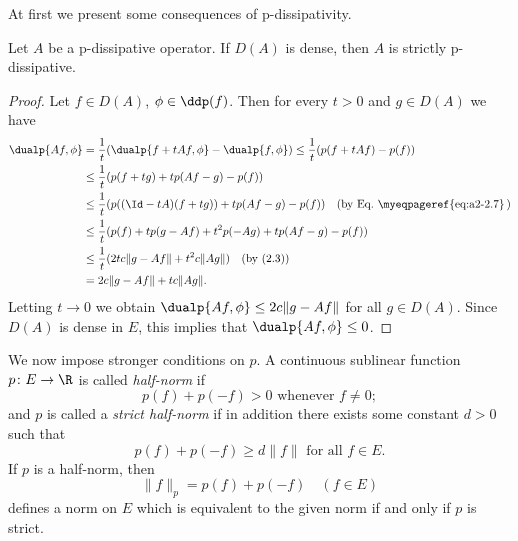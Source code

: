 At first we present some consequences of p-dissipativity.
\begin{theorem}\label{thm:a2-2.7}
Let $A$ be a p-dissipative operator.
If\/ $D(A)$ is dense, then $A$ is strictly p-dissipative.
\end{theorem}
\begin{proof}
Let $f \in D(A)$, $\phi \in \ddp(f)$.
Then for every $t > 0$ and $g \in D(A)$ we have
\begin{align*}
\dualp{Af,\phi} 
&= \frac{1}{t}(\dualp{f + tAf,\phi} - \dualp{f,\phi}) \leq \frac{1}{t}(p(f + tAf) - p(f)) \\
&\leq \frac{1}{t}(p(f + tg) + tp(Af - g) - p(f)) \\
&\leq \frac{1}{t}(p((\Id - tA)(f + tg)) + tp(Af - g) - p(f)) \quad \text{(by Eq.~\myeqpageref{eq:a2-2.7}\,)} \\ %
&\leq \frac{1}{t}(p(f) + tp(g - Af) + t^2p(-Ag) + tp(Af - g) - p(f)) \\
&\leq \frac{1}{t}(2tc\|g - Af\| + t^2c\|Ag\|) \quad \text{(by (2.3))} \\
&= 2c\|g - Af\| + tc\|Ag\|.
\end{align*}
Letting $t \to 0$ we obtain $\dualp{Af,\phi} \leq 2c\|g - Af\|$ for all $g \in D(A)$.
Since $D(A)$ is dense in $E$, this implies that $\dualp{Af,\phi} \leq 0$.
\end{proof}
We now impose stronger conditions on $p$.
A continuous sublinear function $p \colon E \to \R$ is called \emph{half-norm} if
\begin{equation}\label{eq:a2-2.11}
p(f) + p(-f) > 0 \text{ whenever } f \neq 0;
\end{equation}
and $p$ is called a \emph{strict half-norm} if in addition there exists some constant $d > 0$ such that
\begin{equation}\label{eq:a2-2.12}
p(f) + p(-f) \geq d\|f\| \text{ for all } f \in E.
\end{equation}
If\/ $p$ is a half-norm, then
\begin{equation}\label{eq:a2-2.13}
\|f\|_p = p(f) + p(-f) \quad (f \in E)
\end{equation}
defines a norm on $E$ which is equivalent to the given norm if and only if\/ $p$ is strict.

